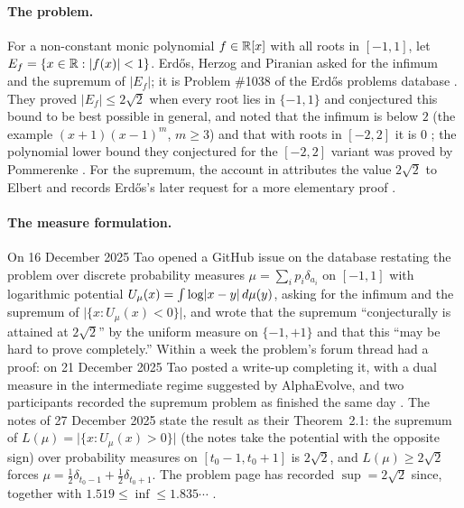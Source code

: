 \documentclass[11pt]{article}
\newcommand{\meas}[1]{\lvert #1 \rvert}
\begin{document}
\paragraph{The problem.}
For a non-constant monic polynomial $f\in\mathbb{R}[x]$ with all roots in $[-1,1]$, let
$E_f=\{x\in\mathbb{R}:\lvert f(x) \rvert<1\}$. Erd\H{o}s, Herzog and Piranian \cite[p.~131]{EHP58} asked for
the infimum and the supremum of $\meas{E_f}$; it is Problem \#1038 of the Erd\H{o}s problems
database \cite{Bloom1038}. They proved $\meas{E_f}\le2\sqrt2$ when every root lies in
$\{-1,1\}$ and conjectured this bound to be best possible in general, and noted that the
infimum is below $2$ (the example $(x+1)(x-1)^m$, $m\ge3$) and that with roots in $[-2,2]$ it
is $0$ \cite{Bloom1038}; the polynomial lower bound they conjectured for the $[-2,2]$ variant
was proved by Pommerenke \cite{Po61}. For the supremum, the account in \cite{DPT} attributes
the value $2\sqrt2$ to Elbert \cite{El66,El68} and records Erd\H{o}s's later request for a more
elementary proof \cite{Er76}.

\paragraph{The measure formulation.}
On 16 December 2025 Tao opened a GitHub issue on the database \cite{Tao179} restating the
problem over discrete probability measures $\mu=\sum_ip_i\delta_{a_i}$ on $[-1,1]$ with
logarithmic potential $U_\mu(x)=\int\log\lvert x-y \rvert\,d\mu(y)$, asking for the infimum and the
supremum of $\meas{\{x:U_\mu(x)<0\}}$, and wrote that the supremum ``conjecturally is attained
at $2\sqrt2$'' by the uniform measure on $\{-1,+1\}$ and that this ``may be hard to prove
completely.'' Within a week the problem's forum thread had a proof: on 21 December 2025 Tao
posted a write-up completing it, with a dual measure in the intermediate regime suggested by
AlphaEvolve, and two participants recorded the supremum problem as finished the same day
\cite{Forum1038}. The notes of 27 December 2025 \cite{TaoNotes} state the result as their
Theorem~2.1: the supremum of $L(\mu)=\meas{\{x:U_\mu(x)>0\}}$ (the notes take the potential
with the opposite sign) over probability measures on $[t_0-1,t_0+1]$ is $2\sqrt2$, and
$L(\mu)\ge2\sqrt2$ forces $\mu=\tfrac12\delta_{t_0-1}+\tfrac12\delta_{t_0+1}$. The problem
page has recorded $\sup=2\sqrt2$ since, together with $1.519\le\inf\le1.835\cdots$
\cite{Bloom1038}.
\end{document}
